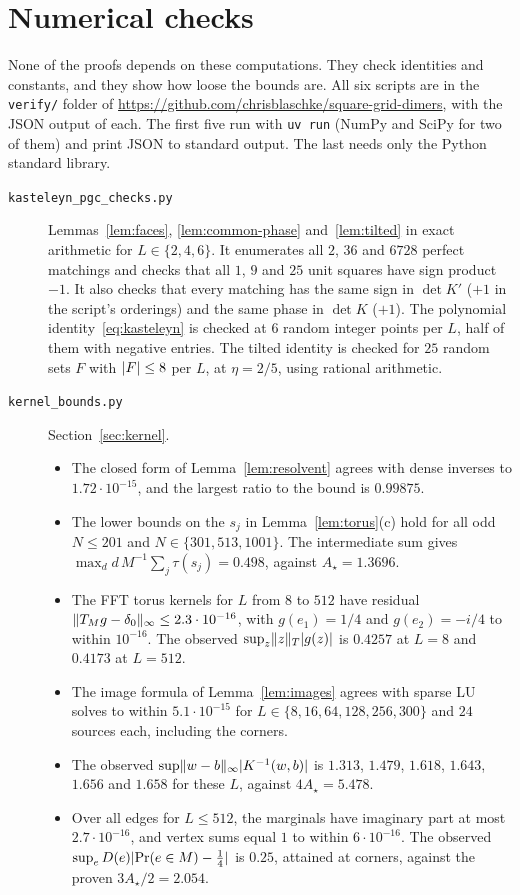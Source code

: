 \section{Numerical checks}\label{app:checks}

None of the proofs depends on these computations. They check identities and constants, and they show how loose the bounds are. All six scripts are in the \texttt{verify/} folder of \url{https://github.com/chrisblaschke/square-grid-dimers}, with the JSON output of each. The first five run with \texttt{uv run} (NumPy and SciPy for two of them) and print JSON to standard output. The last needs only the Python standard library.

\begin{description}
\item[\texttt{kasteleyn\_pgc\_checks.py}] Lemmas~\ref{lem:faces}, \ref{lem:common-phase} and~\ref{lem:tilted} in exact arithmetic for $L\in\{2,4,6\}$. It enumerates all $2$, $36$ and $6728$ perfect matchings and checks that all $1$, $9$ and $25$ unit squares have sign product $-1$. It also checks that every matching has the same sign in $\det K'$ ($+1$ in the script's orderings) and the same phase in $\det K$ ($+1$). The polynomial identity~\eqref{eq:kasteleyn} is checked at $6$ random integer points per $L$, half of them with negative entries. The tilted identity is checked for $25$ random sets $F$ with $\lvert F\rvert\le8$ per $L$, at $\eta=2/5$, using rational arithmetic.

\item[\texttt{kernel\_bounds.py}] Section~\ref{sec:kernel}.
\begin{itemize}
\item The closed form of Lemma~\ref{lem:resolvent} agrees with dense inverses to $1.72\cdot10^{-15}$, and the largest ratio to the bound is $0.99875$.
\item The lower bounds on the $s_j$ in Lemma~\ref{lem:torus}(c) hold for all odd $N\le201$ and $N\in\{301,513,1001\}$. The intermediate sum gives $\max_d d\,M^{-1}\sum_j\tau(s_j)=0.498$, against $A_\star=1.3696$.
\item The FFT torus kernels for $L$ from $8$ to $512$ have residual $\lVert T_Mg-\delta_0\rVert_\infty\le2.3\cdot10^{-16}$, with $g(e_1)=1/4$ and $g(e_2)=-i/4$ to within $10^{-16}$. The observed $\sup_z\lVert z\rVert_T\lvert g(z)\rvert$ is $0.4257$ at $L=8$ and $0.4173$ at $L=512$.
\item The image formula of Lemma~\ref{lem:images} agrees with sparse LU solves to within $5.1\cdot10^{-15}$ for $L\in\{8,16,64,128,256,300\}$ and $24$ sources each, including the corners.
\item The observed $\sup\lVert w-b\rVert_\infty\lvert K^{-1}(w,b)\rvert$ is $1.313$, $1.479$, $1.618$, $1.643$, $1.656$ and $1.658$ for these $L$, against $4A_\star=5.478$.
\item Over all edges for $L\le512$, the marginals have imaginary part at most $2.7\cdot10^{-16}$, and vertex sums equal $1$ to within $6\cdot10^{-16}$. The observed $\sup_eD(e)\lvert \Pr(e\in M)-\frac14\rvert$ is $0.25$, attained at corners, against the proven $3A_\star/2=2.054$.
\end{itemize}


\end{description}
